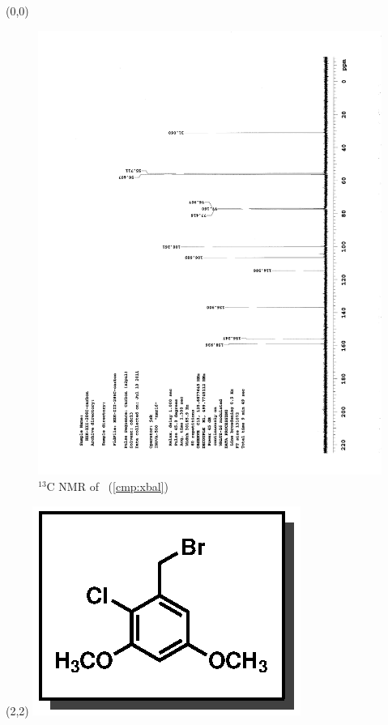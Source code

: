 \clearpage
\begin{textblock}{20}(0,0)
\begin{figure}[htb]
\caption{$^{13}$C NMR of  \CMPxbal\ (\ref{cmp:xbal})}
\includegraphics[scale=0.75, trim = 0mm 0mm 0mm 5mm,
clip]{chp_singlecarbon/images/nmr/xbalC}
\vspace{-100pt}
\end{figure}
\end{textblock}
\begin{textblock}{1}(2,2)
\includegraphics[scale=0.8, angle=90]{chp_singlecarbon/images/xbal}
\end{textblock}
\clearpage

